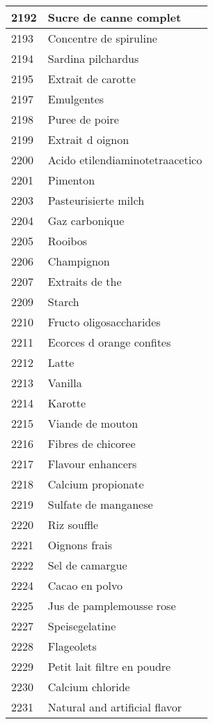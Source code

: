 \begin{longtable}{|l|l|}
2192 & Sucre de canne complet \\ \hline 
2193 & Concentre de spiruline \\ \hline 
2194 & Sardina pilchardus \\ \hline 
2195 & Extrait de carotte \\ \hline 
2197 & Emulgentes \\ \hline 
2198 & Puree de poire \\ \hline 
2199 & Extrait d oignon \\ \hline 
2200 & Acido etilendiaminotetraacetico \\ \hline 
2201 & Pimenton \\ \hline 
2203 & Pasteurisierte milch \\ \hline 
2204 & Gaz carbonique \\ \hline 
2205 & Rooibos \\ \hline 
2206 & Champignon \\ \hline 
2207 & Extraits de the \\ \hline 
2209 & Starch \\ \hline 
2210 & Fructo oligosaccharides \\ \hline 
2211 & Ecorces d orange confites \\ \hline 
2212 & Latte \\ \hline 
2213 & Vanilla \\ \hline 
2214 & Karotte \\ \hline 
2215 & Viande de mouton \\ \hline 
2216 & Fibres de chicoree \\ \hline 
2217 & Flavour enhancers \\ \hline 
2218 & Calcium propionate \\ \hline 
2219 & Sulfate de manganese \\ \hline 
2220 & Riz souffle \\ \hline 
2221 & Oignons frais \\ \hline 
2222 & Sel de camargue \\ \hline 
2224 & Cacao en polvo \\ \hline 
2225 & Jus de pamplemousse rose \\ \hline 
2227 & Speisegelatine \\ \hline 
2228 & Flageolets \\ \hline 
2229 & Petit lait filtre en poudre \\ \hline 
2230 & Calcium chloride \\ \hline 
2231 & Natural and artificial flavor \\ \hline 

\end{longtable}
